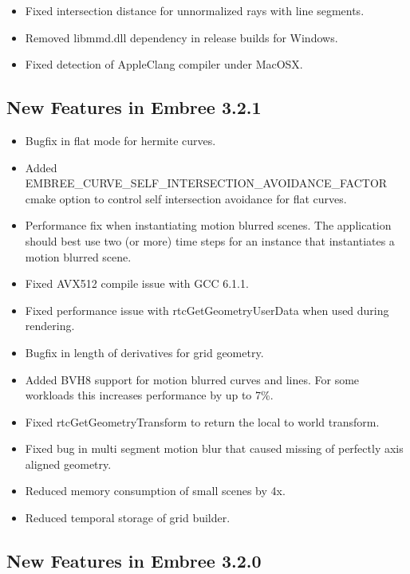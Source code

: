 \begin{itemize}
\tightlist
\item
  Fixed intersection distance for unnormalized rays with line segments.
\item
  Removed libmmd.dll dependency in release builds for Windows.
\item
  Fixed detection of AppleClang compiler under MacOSX.
\end{itemize}

\subsection{New Features in Embree
3.2.1}\label{new-features-in-embree-3.2.1}

\begin{itemize}
\tightlist
\item
  Bugfix in flat mode for hermite curves.
\item
  Added EMBREE\_CURVE\_SELF\_INTERSECTION\_AVOIDANCE\_FACTOR cmake
  option to control self intersection avoidance for flat curves.
\item
  Performance fix when instantiating motion blurred scenes. The
  application should best use two (or more) time steps for an instance
  that instantiates a motion blurred scene.
\item
  Fixed AVX512 compile issue with GCC 6.1.1.
\item
  Fixed performance issue with rtcGetGeometryUserData when used during
  rendering.
\item
  Bugfix in length of derivatives for grid geometry.
\item
  Added BVH8 support for motion blurred curves and lines. For some
  workloads this increases performance by up to 7\%.
\item
  Fixed rtcGetGeometryTransform to return the local to world transform.
\item
  Fixed bug in multi segment motion blur that caused missing of
  perfectly axis aligned geometry.
\item
  Reduced memory consumption of small scenes by 4x.
\item
  Reduced temporal storage of grid builder.
\end{itemize}

\subsection{New Features in Embree
3.2.0}\label{new-features-in-embree-3.2.0}

